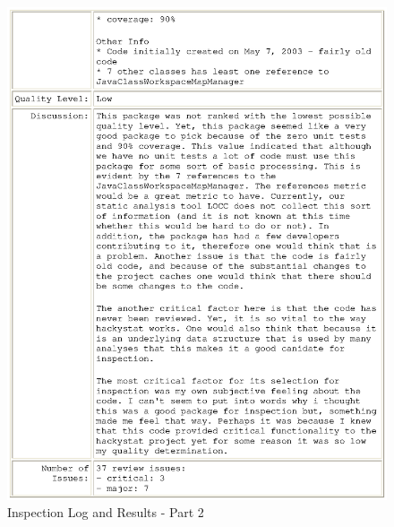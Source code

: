 \begin{figure}[htbp]
  \centering
  \includegraphics[width=1.0\textwidth]{figs/engineeringlog_word_html_2.eps}
  \caption{Inspection Log and Results - Part 2}
  \label{fig:log2}
\end{figure}

